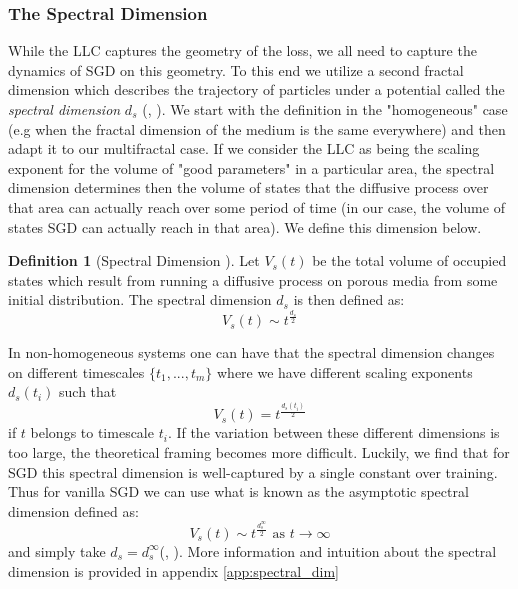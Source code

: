 \documentclass{article} %
\theoremstyle{definition}
\newtheorem{definition}{Definition}[section]
\begin{document}
\subsubsection{The Spectral Dimension}
While the LLC captures the geometry of the loss, we all need to capture the dynamics of SGD on this geometry. To this end we utilize a second fractal dimension which describes the trajectory of particles under a potential called the \textit{spectral dimension} $d_s$ (\citep{Mill_n_2021}, \citep{BOUCHAUD1990127}). We start with the definition in the "homogeneous" case (e.g when the fractal dimension of the medium is the same everywhere) and then adapt it to our multifractal case. If we consider the LLC as being the scaling exponent for the volume of "good parameters" in a particular area, the spectral dimension determines then the volume of states that the diffusive process over that area can actually reach over some period of time (in our case, the volume of states SGD can actually reach in that area). We define this dimension below. 
\begin{definition}[Spectral Dimension \citep{BOUCHAUD1990127}]\label{spectral_dim}
Let $V_s(t)$ be the total volume of occupied states which result from running a diffusive process on porous media from some initial distribution. The spectral dimension $d_s$ is then defined as: 
\begin{equation}
    V_s(t) \sim t^{\frac{d_s}{2}}
\end{equation}
\end{definition}

In non-homogeneous systems one can have that the spectral dimension changes on different timescales $\{t_1, ..., t_m\}$ where we have different scaling exponents $d_s(t_i)$ such that 
\begin{equation}
    V_s(t) = t^{\frac{d_s(t_i)}{2}}
\end{equation}
if $t$ belongs to timescale $t_i$. If the variation between these different dimensions is too large, the theoretical framing becomes more difficult. Luckily, we find that for SGD this spectral dimension is well-captured by a single constant over training. Thus for vanilla SGD we can use what is known as the asymptotic spectral dimension defined as:
\begin{equation}
    V_s(t) \sim t^{\frac{d_s^\infty}{2}} \text{ as } t \to \infty
\end{equation}
and simply take $d_s = d_s^\infty$(\citep{ben-Avraham_Havlin_2000}, \citep{PALADIN1987147}). More information and intuition about the spectral dimension is provided in appendix \ref{app:spectral_dim}
\end{document}
